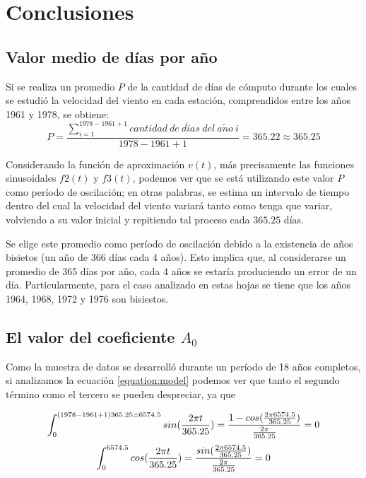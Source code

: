 \documentclass[journal, monochrome]{IEEEtran}
\begin{document}
\vspace{1cm}
\section{Conclusiones}
\label{section:conclusions}
\vspace{0.5cm}
\subsection{Valor medio de días por año}
Si se realiza un promedio $P$ de la cantidad de días de cómputo durante los cuales se estudió la velocidad del viento en cada
estación, comprendidos entre los años 1961 y 1978, se obtiene:
\begin{equation}
 P = \frac{\displaystyle\sum_{i=1}^{1978-1961+1} cantidad \: de \: d\acute{i}as \: del \: a\tilde{n}o \: i}{1978-1961+1} = 365.22 \approx 365.25
\end{equation}

Considerando la función de aproximación $v(t)$, más precisamente las funciones sinusoidales $f2(t)$ y $f3(t)$, podemos ver que se está utilizando
este valor $P$ como período de oscilación; en otras palabras, se estima un intervalo de tiempo dentro del cual la velocidad del viento variará tanto
como tenga que variar, volviendo a su valor inicial y repitiendo tal proceso cada $365.25$ días.

Se elige este promedio como período de oscilación debido a la existencia de años bisietos (un año de 366 días cada 4 años). Esto implica que, al considerarse un
promedio de 365 días por año, cada 4 años se estaría produciendo un error de un día. Particularmente, para el caso
analizado en estas hojas se tiene que los años 1964, 1968, 1972 y 1976 son bisiestos.

\vspace{0.5cm}
\subsection{El valor del coeficiente $A_{0}$}

Como la muestra de datos se desarrolló durante un período de 18 años completos, si analizamos la ecuación \ref{equation:model} podemos ver que tanto el segundo término como el tercero se pueden despreciar, ya que

\begin{equation}
\int_0^{(1978-1961+1)365.25 = 6574.5} sin( \frac{2 \pi t}{365.25} )  = \frac{1-cos(\frac{2 \pi 6574.5}{365.25})}{ \frac{2 \pi }{365.25}} = 0 \\ 
\end{equation}
\begin{equation}
\int_0^{6574.5} cos( \frac{2 \pi t}{365.25} )  = \frac{sin(\frac{2 \pi 6574.5}{365.25})}{ \frac{2 \pi }{365.25}} = 0 \\ 
\end{equation}
\end{document}
